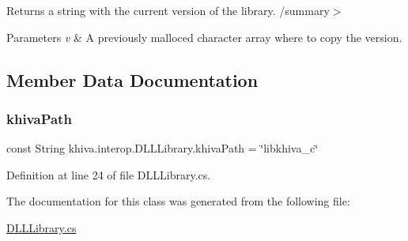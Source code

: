 Returns a string with the current version of the library. /summary$>$ 
\begin{DoxyParams}{Parameters}
{\em v} & A previously malloced character array where to copy the version.\\
\hline
\end{DoxyParams}




\subsection{Member Data Documentation}
\mbox{\label{classkhiva_1_1interop_1_1_d_l_l_library_ab866b901c6b9b3ba453be2e7e0720299}} 
\subsubsection{\texorpdfstring{khiva\+Path}{khivaPath}}
{\footnotesize\ttfamily const String khiva.\+interop.\+D\+L\+L\+Library.\+khiva\+Path = \char`\"{}libkhiva\+\_\+c\char`\"{}}



Definition at line 24 of file D\+L\+L\+Library.\+cs.



The documentation for this class was generated from the following file\+:\begin{DoxyCompactItemize}
\item 
\mbox{\hyperlink{_d_l_l_library_8cs}{D\+L\+L\+Library.\+cs}}\end{DoxyCompactItemize}
